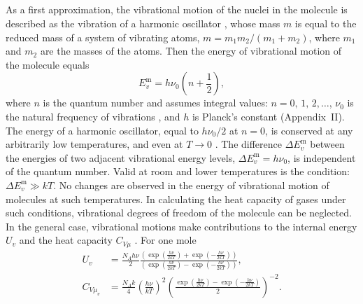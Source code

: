 \subsection{}\label{10.7.4} As a first approximation, the vibrational motion of the nuclei in the molecule is described as the vibration of a harmonic oscillator , whose mass $m$ is equal to the reduced mass of a system of vibrating atoms, $m = m_{1}m_{2}/(m_{1} + m_{2})$, where $m_{1}$ and $m_{2}$ are the masses of the atoms. Then the energy of vibrational motion of the molecule equals 
\begin{equation*}%
E_{v}^{\text{m}} = h \nu_{0} \left( n + \frac{1}{2}\right),
\end{equation*}
where $n$ is the quantum number and assumes integral values: $n = 0, \,1,\, 2, \ldots{}$, $\nu_{0}$ is the natural frequency of vibrations , and $h$ is Planck's constant (Appendix~II). The energy of a harmonic oscillator, equal to $h\nu_{0}/2$ at $n = 0$, is conserved at any arbitrarily low temperatures, and even at $T \to 0$ . The difference $\Delta E_{v}^{\text{m}}$ between the energies of two adjacent vibra­tional energy levels, $\Delta E_{v}^{\text{m}} = h\nu_{0}$, is independent of the quantum number. Valid at room and lower temperatures is the condi­tion: $\Delta E^{\text{m}}_{v} \gg kT$. No changes are observed in the energy of vibrational motion of molecules at such temperatures. In cal­culating the heat capacity of gases under such conditions, vibrational degrees of freedom of the molecule can be neglected. In the general case, vibrational motions make contributions to the internal energy $U_{v}$  and the heat capacity $C_{V\mu}$ . For one mole
\begin{align*}%
U_{v} & = \frac{N_{A}h \nu}{2} \frac{\left(\exp \left(\frac{h \nu}{2kT}\right) + \exp \left(-\frac{h \nu}{2kT}\right) \right)}{\left(\exp \left(\frac{h \nu}{2kT}\right) - \exp \left(-\frac{h \nu}{2kT}\right) \right)}, \\
C_{V\mu_{v}} & = \frac{N_{A}k}{4} \left(\frac{h \nu}{kT}\right)^{2} \left(\frac{\exp \left(\frac{h \nu}{2kT}\right) - \exp \left(-\frac{h \nu}{2kT}\right)}{2} \right)^{-2}.
\end{align*}
